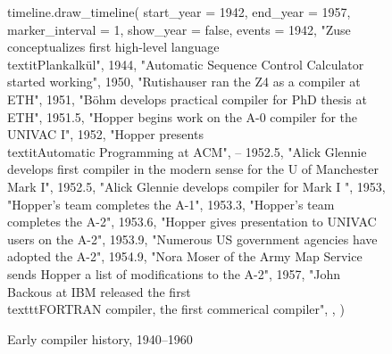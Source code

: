 \pagebreak
\begin{figure}[h]
\begin{luacode}
timeline.draw_timeline({ 
    start_year = 1942,
    end_year = 1957,
    marker_interval = 1,
    show_year = false,
    events = {
        {1942, "Zuse conceptualizes first high-level language \\textit{Plankalkül}"},
        {1944, "Automatic Sequence Control Calculator started working"},
        {1950, "Rutishauser ran the Z4 as a compiler at ETH"},
        {1951, "B{\"o}hm develops practical compiler for PhD thesis at ETH"},
        {1951.5, "Hopper begins work on the A-0 compiler for the UNIVAC I"},
        {1952, "Hopper presents \\textit{Automatic Programming} at ACM"},
        -- {1952.5, "Alick Glennie develops first compiler in the modern sense for the U of Manchester Mark I"},
        {1952.5, "Alick Glennie develops compiler for Mark I "},
        {1953, "Hopper's team completes the A-1"},
        {1953.3, "Hopper's team completes the A-2"},
        {1953.6, "Hopper gives presentation to UNIVAC users on the A-2"},
        {1953.9, "Numerous US government agencies have adopted the A-2"},
        {1954.9, "Nora Moser of the Army Map Service sends Hopper a list of modifications to the A-2"},
        {1957, "John Backous at IBM released the first \\texttt{FORTRAN} compiler, the first commerical compiler"},
    },
})
\end{luacode}
\caption{Early compiler history, 1940--1960}
\label{fig:dawn-timeline}
\end{figure}
